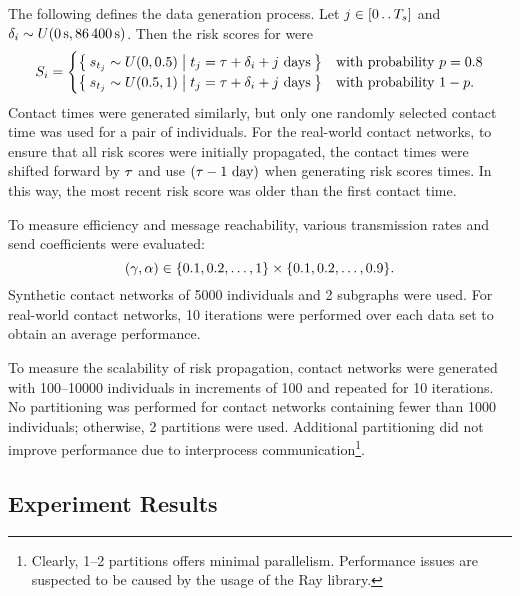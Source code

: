 The following defines the data generation process. Let $j \in [0 \mathinner {\ldotp \ldotp} T_s]$ and $\delta_i \sim U(\qty{0}{\second}, \qty{86400}{\second})$. Then the risk scores for  were
\begin{equation*}
  S_i = 
    \begin{cases}
      \Set{ s_{t_j} \sim U(\num{0}, \num{0.5}) |  t_j = \tau+ \delta_i + j \text{ days}} & \text{with probability } p = \num{0.8} \\
      \Set{ s_{t_j} \sim U(\num{0.5}, \num{1}) | t_j = \tau+ \delta_i + j \text{ days}} & \text{with probability } 1 - p.
    \end{cases}
\end{equation*}
Contact times were generated similarly, but only one randomly selected contact time was used for a pair of individuals. For the real-world contact networks, to ensure that all risk scores were initially propagated, the contact times were shifted forward by $\tau$ and use $(\tau - 1 \text{ day})$ when generating risk scores times. In this way, the most recent risk score was older than the first contact time.

To measure efficiency and message reachability, various transmission rates and send coefficients were evaluated:
\begin{equation*}
  (\gamma, \alpha) \in \{\num{0.1}, \num{0.2}, \ldots, \num{1}\} \times \{\num{0.1}, \num{0.2}, \ldots, \num{0.9}\}.
\end{equation*}
Synthetic contact networks of \num{5000} individuals and \num{2} subgraphs were used. For real-world contact networks, \num{10} iterations were performed over each data set to obtain an average performance.

To measure the scalability of risk propagation, contact networks were generated with \numrange{100}{10000} individuals in increments of \num{100} and repeated for \num{10} iterations. No partitioning was performed for contact networks containing fewer than \num{1000} individuals; otherwise, \num{2} partitions were used. Additional partitioning did not improve performance due to interprocess communication\footnote{Clearly, \numrange{1}{2} partitions offers minimal parallelism. Performance issues are suspected to be caused by the usage of the Ray library.}.

\subsection{Experiment Results}

